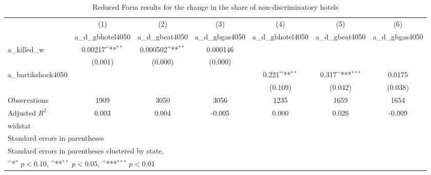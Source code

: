 \begin{table}[htbp]\centering
\def\sym#1{\ifmmode^{#1}\else\(^{#1}\)\fi}
\caption{Reduced Form results for the change in the share of non-discriminatory hotels}
\begin{tabular}{l*{6}{c}}
\hline\hline
                    &\multicolumn{1}{c}{(1)}&\multicolumn{1}{c}{(2)}&\multicolumn{1}{c}{(3)}&\multicolumn{1}{c}{(4)}&\multicolumn{1}{c}{(5)}&\multicolumn{1}{c}{(6)}\\
                    &\multicolumn{1}{c}{a\_d\_gbhotel4050}&\multicolumn{1}{c}{a\_d\_gbeat4050}&\multicolumn{1}{c}{a\_d\_gbgas4050}&\multicolumn{1}{c}{a\_d\_gbhotel4050}&\multicolumn{1}{c}{a\_d\_gbeat4050}&\multicolumn{1}{c}{a\_d\_gbgas4050}\\
\hline
a\_killed\_w          &     0.00217\sym{**} &    0.000502\sym{**} &    0.000146         &                     &                     &                     \\
                    &     (0.001)         &     (0.000)         &     (0.000)         &                     &                     &                     \\
[1em]
a\_bartikshock4050   &                     &                     &                     &       0.221\sym{**} &       0.317\sym{***}&      0.0175         \\
                    &                     &                     &                     &     (0.109)         &     (0.042)         &     (0.038)         \\
\hline
Observations        &        1909         &        3050         &        3056         &        1235         &        1659         &        1654         \\
Adjusted \(R^{2}\)  &       0.003         &       0.004         &      -0.005         &       0.000         &       0.026         &      -0.009         \\
widstat             &                     &                     &                     &                     &                     &                     \\
\hline\hline
\multicolumn{7}{l}{\footnotesize Standard errors in parentheses}\\
\multicolumn{7}{l}{\footnotesize Standard errors in parentheses clustered by state.}\\
\multicolumn{7}{l}{\footnotesize \sym{*} \(p<0.10\), \sym{**} \(p<0.05\), \sym{***} \(p<0.01\)}\\
\end{tabular}
\end{table}
